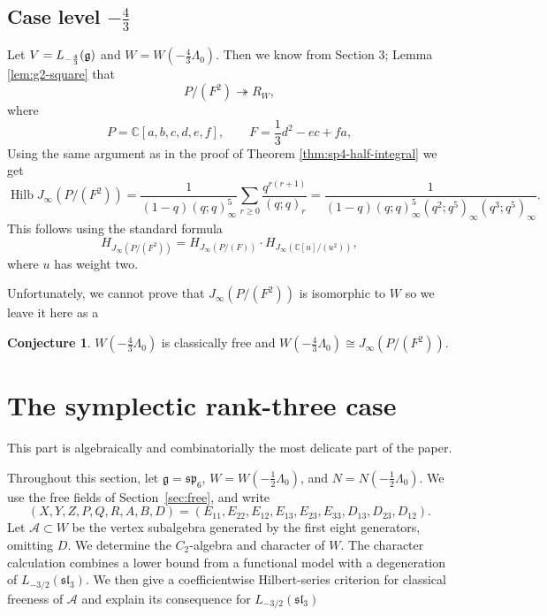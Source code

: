 \documentclass[11pt]{amsart}
\theoremstyle{definition}
\newtheorem{conjecture}[theorem]{Conjecture}
\theoremstyle{remark}
\newcommand{\g}{\mathfrak g}
\newcommand{\spalg}{\mathfrak{sp}}
\begin{document}
\subsection{Case level $-\frac43$}

Let $V=L_{-\frac43}(\frak{g})$ and $W=W(-\frac43\Lambda_0)$. Then we know from Section 3; Lemma \ref{lem:g2-square}
that $$P/(F^2) \twoheadrightarrow R_{W},$$
where  
\[
P=\mathbb C[a,b,c,d,e,f],\qquad F=\frac13d^2-ec+fa,
\]
Using the same argument as in the proof of Theorem \ref{thm:sp4-half-integral} we get
\[
\operatorname{Hilb}J_\infty(P/(F^2))
=
\frac{1}{(1-q)(q;q)_\infty^5}
\sum_{r\ge0}\frac{q^{r(r+1)}}{(q;q)_r}
=
\frac{1}{
(1-q)(q;q)_\infty^5
(q^2;q^5)_\infty(q^3;q^5)_\infty
}.
\]
This follows using the standard formula 
\[
H_{J_\infty(P/(F^2))}
=
H_{J_\infty(P/(F))}
\cdot H_{J_\infty(\mathbb C[u]/(u^2))},
\]
where $u$ has weight two.

Unfortunately, we cannot prove that $J_\infty(P/(F^2))$ is isomorphic to $W$ so we leave it here as a 

\begin{conjecture}\label{conj:rogers-ramanujian} $W(-\frac{4}{3} \Lambda_0)$ is classically free and $W(-\frac{4}{3} \Lambda_0) \cong J_\infty(P/(F^2))$.

\end{conjecture}


\section{The symplectic rank-three case}\label{sec:sp6}

This part is algebraically and combinatorially the most delicate part of the paper. 

Throughout this section, let $\g=\spalg_6$,
$W=W(-\frac12\Lambda_0)$, and $N=N(-\frac12\Lambda_0)$.
We use the free fields of Section~\ref{sec:free}, and write
\[
 (X,Y,Z,P,Q,R,A,B,D)
 =(E_{11},E_{22},E_{12},E_{13},E_{23},E_{33},D_{13},D_{23},D_{12}).
\]
Let $\mathcal A\subset W$ be the vertex subalgebra generated by the first
eight generators, omitting $D$. We determine the $C_2$-algebra and character
of $W$. The character calculation combines a lower bound from a functional
model with a degeneration of $L_{-3/2}(\mathfrak{sl}_3)$. We then give a
coefficientwise Hilbert-series criterion for classical freeness of
$\mathcal A$ and explain its consequence for $L_{-3/2}(\mathfrak{sl}_3)$
\end{document}
